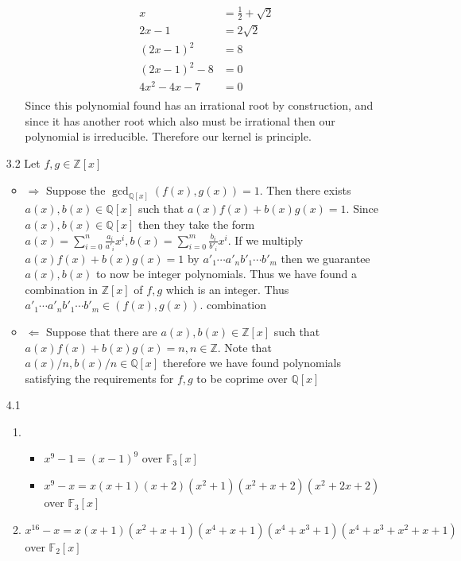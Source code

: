 \documentclass[12pt, letterpaper]{article}
\newcommand{\Z}{\mathbb{Z}}
\newcommand{\Q}{\mathbb{Q}}
\begin{document}
\begin{enumerate}
\begin{enumerate}
		\begin{align*}
			x &= \frac{1}{2} + \sqrt{2}\\
			2x-1 &= 2\sqrt{2}\\
			(2x-1)^2 &= 8\\
			(2x-1)^2 - 8 &= 0\\
			4x^2 -4x -7 &= 0\\
		\end{align*}
		Since this polynomial found has an irrational root by construction, and 
		since it has another root which also must be irrational then our
		polynomial is irreducible.  Therefore our kernel is principle.  
	\end{enumerate}
	\item[3.2] Let $f, g \in \Z[x]$
	\begin{itemize}
		\item $\Rightarrow$ Suppose the $\gcd_{\Q[x]}(f(x), g(x)) = 1$.  Then
		there exists $a(x), b(x) \in \Q[x]$ such that $a(x)f(x) + b(x) g(x) = 1$.
		Since $a(x), b(x) \in \Q[x]$ then they take the form $a(x) = \sum_{i = 0}^n \frac{a_i}{a'_i}x^i, b(x) = \sum_{i = 0}^m \frac{b_i}{b'_i}x^i$.  If we multiply 
		$a(x)f(x) + b(x) g(x) = 1$ by $a'_1\cdots a'_n b'_1 \cdots b'_m$ then we 
		guarantee $a(x), b(x)$ to now be integer polynomials.  Thus we have found 
		a combination in $\Z[x]$ of $f,g$ which is an integer.  Thus $a'_1\cdots a'_n b'_1 \cdots b'_m \in (f(x),g(x))$.  
		combination  
		\item $\Leftarrow$ Suppose that there are $a(x), b(x) \in \Z[x]$ such that 
		$a(x)f(x) + b(x)g(x) = n, n \in \Z$.  Note that $a(x)/n, b(x)/n \in \Q[x]$
		therefore we have found polynomials satisfying the requirements for $f,g$
		to be coprime over $\Q[x]$  
	\end{itemize}
	\item[4.1]
	\begin{enumerate}
		\item 		
		\begin{itemize}
			\item $x^9 - 1 = (x-1)^9$ over $\mathbb{F}_3[x]$
			\item $x^9 - x = x(x+1)(x+2)(x^2+1)(x^2 + x + 2)(x^2 + 2x + 2)$ over $\mathbb{F}_3[x]$
		\end{itemize}
		\item $x^{16} - x = x(x+1)(x^2+x+1)(x^4+x+1)(x^4 + x^3 + 1)(x^4 + x^3 + x^2 + x + 1)$ over $\mathbb{F}_2[x]$
	\end{enumerate}
\end{enumerate}
\end{document}
